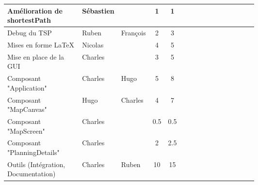 \begin{longtable}{|p{0.3\linewidth}|l|l|c|c|p{0.3\linewidth}|}
Amélioration de shortestPath                & Sébastien                                      &                                           & 1                             & 1                            &                                                             \\ \hline
Debug du TSP                                & Ruben                                          & François                                  & 2                             & 3                            &                                                             \\ \hline
Mises en forme LaTeX                        & Nicolas                                        &                                           & 4                             & 5                            &                                                             \\ \hline
Mise en place de la GUI                     & Charles                                        &                                           & 3                             & 5                            &                                                             \\ \hline
Composant "Application"                     & Charles                                        & Hugo                                      & 5                             & 8                            &                                                             \\ \hline
Composant "MapCanvas"                       & Hugo                                           & Charles                                   & 4                             & 7                            &                                                             \\ \hline
Composant "MapScreen"                       & Charles                                        &                                           & 0.5                           & 0.5                          &                                                             \\ \hline
Composant "PlanningDetails"                 & Charles                                        &                                           & 2                             & 2.5                          &                                                             \\ \hline
Outils (Intégration, Documentation)         & Charles                                        & Ruben                                     & 10                            & 15                           &                                                             \\ \hline
\end{longtable}
